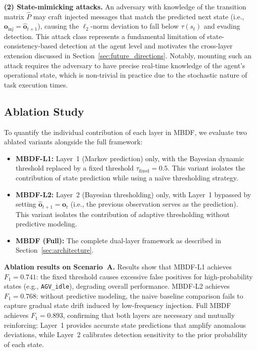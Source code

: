\documentclass[manuscript,screen,review]{acmart}
\begin{document}
\textbf{(2) State-mimicking attacks.}
An adversary with knowledge of the transition matrix
$\hat{P}$ may craft injected messages that match the
predicted next state
(i.e., $\mathbf{o}_{\mathrm{inj}} =
\hat{\mathbf{o}}_{t+1}$), causing the $\ell_2$-norm
deviation to fall below $\tau(s_t)$ and evading
detection. This attack class represents a fundamental
limitation of state-consistency-based detection at the
agent level and motivates the cross-layer extension
discussed in Section~\ref{sec:future_directions}.
Notably, mounting such an attack requires the adversary
to have precise real-time knowledge of the agent's
operational state, which is non-trivial in practice due
to the stochastic nature of task execution times.

\subsection{Ablation Study}
\label{sec:ablation}

To quantify the individual contribution of each layer in
MBDF, we evaluate two ablated variants alongside the full
framework:

\begin{itemize}
\item \textbf{MBDF-L1:} Layer~1 (Markov prediction)
only, with the Bayesian dynamic threshold replaced by a
fixed threshold $\tau_{\mathrm{fixed}} = 0.5$. This
variant isolates the contribution of state prediction
while using a na\"{i}ve thresholding strategy.

\item \textbf{MBDF-L2:} Layer~2 (Bayesian thresholding)
only, with Layer~1 bypassed by setting
$\hat{\mathbf{o}}_{t+1} = \mathbf{o}_t$ (i.e., the
previous observation serves as the prediction). This
variant isolates the contribution of adaptive
thresholding without predictive modeling.

\item \textbf{MBDF (Full):} The complete dual-layer
framework as described in Section~\ref{sec:architecture}.
\end{itemize}

\textbf{Ablation results on Scenario~A.}
Results show that MBDF-L1 achieves $F_1 = 0.741$: the
fixed threshold causes excessive false positives for
high-probability states (e.g., \texttt{AGV\_idle}),
degrading overall performance. MBDF-L2 achieves
$F_1 = 0.768$: without predictive modeling, the naive
baseline comparison fails to capture gradual state drift
induced by low-frequency injection. Full MBDF achieves
$F_1 = 0.893$, confirming that both layers are necessary
and mutually reinforcing: Layer~1 provides accurate state
predictions that amplify anomalous deviations, while
Layer~2 calibrates detection sensitivity to the prior
probability of each state.
\end{document}
